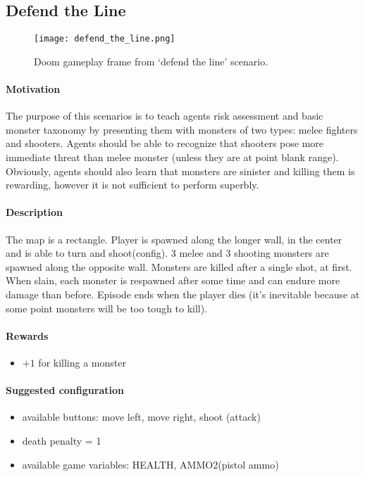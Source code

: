 	\subsection{Defend the Line}
		\begin{figure}
			\centering
			\texttt{[image: defend\_the\_line.png]}
			\caption{Doom gameplay frame from `defend the line' scenario.}\label{fig:defend_the_line}
		\end{figure}
		\paragraph{Motivation} 
			The purpose of this scenarios is to teach agents risk assessment and basic monster taxonomy by presenting them with monsters of two types: melee fighters and shooters. Agents should be able to recognize that shooters pose more immediate threat than melee monster (unless they are at point blank range). Obviously, agents should also learn that monsters are sinister and killing them is rewarding, however it is not sufficient to perform superbly.
		\paragraph{Description}
			The map is a rectangle. Player is spawned along the longer wall, in the center and is able to turn and shoot(config). 3 melee and 3 shooting monsters are spawned along the opposite wall. Monsters are killed after a single shot, at first. When slain, each monster is respawned after some time and can endure more damage than before. Episode ends when the player dies (it's inevitable because at some point monsters will be too tough to kill).
		\paragraph{Rewards}
			\begin{itemize}
				\item $+1$ for killing a monster
			\end{itemize}

		\paragraph{Suggested configuration}
			\begin{itemize}
				\item available buttons: move left, move right, shoot (attack)
				\item death penalty = 1
				\item available game variables: HEALTH, AMMO2(pistol ammo)
			\end{itemize}
	\newpage

